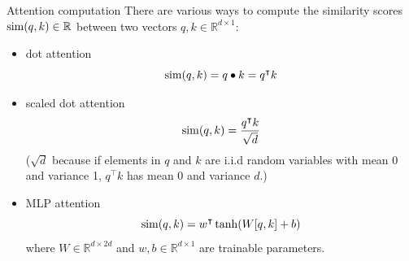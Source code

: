 \begin{frame}{Attention computation}
\vspace{-3mm}
There are various ways to compute the similarity scores $\operatorname{sim}(q, k) \in \mathbb{R}$
between two vectors $q, k \in \mathbb{R}^{d \times 1}$:
\begin{itemize}
\item dot attention 
\[
\operatorname{sim}(q, k) = q \bullet k = q^{\intercal} k
\]
\pause
\item scaled dot attention 
\[
\operatorname{sim}(q, k) = \dfrac{q^{\intercal} k}{\sqrt{d}}
\]
\pause
{\small ($\sqrt{d}$ because if elements in $q$ and $k$ are i.i.d random variables with mean 0 and variance 1, $q^{\intercal} k$ has mean 0 and variance $d$.)}
\pause
\item MLP attention 
\[
\operatorname{sim}(q, k) = w^{\intercal} \tanh(W [q, k] + b)
\]
where $W \in \mathbb{R}^{d \times 2d}$ and $w, b \in \mathbb{R}^{d \times 1}$ are trainable parameters.
\end{itemize}
\end{frame}

